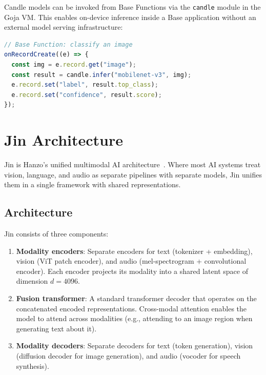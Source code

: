 \documentclass[11pt]{article}
\begin{document}
Candle models can be invoked from Base Functions via the \texttt{candle}
module in the Goja VM. This enables on-device inference inside a Base
application without an external model serving infrastructure:

\begin{lstlisting}[language=JavaScript,caption={Candle inference from a Base Function.}]
// Base Function: classify an image
onRecordCreate((e) => {
  const img = e.record.get("image");
  const result = candle.infer("mobilenet-v3", img);
  e.record.set("label", result.top_class);
  e.record.set("confidence", result.score);
});
\end{lstlisting}

\section{Jin Architecture}
\label{sec:jin}

Jin is Hanzo's unified multimodal AI architecture~\cite{hanzojin}. Where most
AI systems treat vision, language, and audio as separate pipelines with
separate models, Jin unifies them in a single framework with shared
representations.

\subsection{Architecture}

Jin consists of three components:

\begin{enumerate}[leftmargin=1.4em]
    \item \textbf{Modality encoders}: Separate encoders for text (tokenizer +
    embedding), vision (ViT patch encoder), and audio (mel-spectrogram +
    convolutional encoder). Each encoder projects its modality into a shared
    latent space of dimension $d = 4096$.
    \item \textbf{Fusion transformer}: A standard transformer decoder that
    operates on the concatenated encoded representations. Cross-modal
    attention enables the model to attend across modalities (e.g., attending
    to an image region when generating text about it).
    \item \textbf{Modality decoders}: Separate decoders for text (token
    generation), vision (diffusion decoder for image generation), and audio
    (vocoder for speech synthesis).
\end{enumerate}
\end{document}
